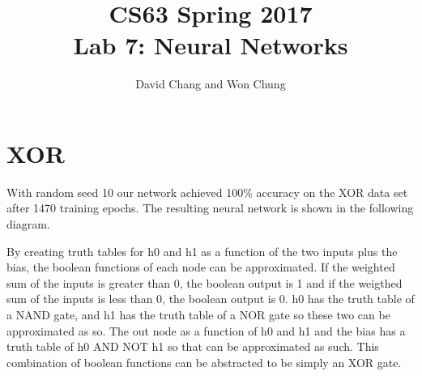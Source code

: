 \documentclass[11pt]{article}
\title{CS63 Spring 2017\\Lab 7: Neural Networks}
\author{David Chang and Won Chung}%
\begin{document}
\maketitle

\section{XOR}

With random seed 10 %
our network achieved 100\% accuracy on the XOR data set after 1470 %
training epochs.
The resulting neural network is shown in the following diagram.

\begin{center}
\end{center}


By creating truth tables for h0 and h1 as a function of the two inputs plus the bias, the boolean
functions of each node can be approximated. If the weighted sum of the inputs is greater than 0, the
boolean output is 1 and if the weigthed sum of the inputs is less than 0, the boolean output is 0. h0
has the truth table of a NAND gate, and h1 has the truth table of a NOR gate so these two can be
approximated as so. The out node as a function of h0 and h1 and the bias has a truth table of h0 AND NOT
h1 so that can be approximated as such. This combination of boolean functions can be abstracted to be
simply an XOR gate.
\end{document}
